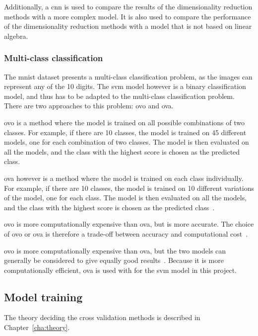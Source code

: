 Additionally, a \gls{cnn} is used to compare the results of the dimensionality reduction methods with a more complex model. It is also used to compare the performance of the dimensionality reduction methods with a model that is not based on linear algebra.


\subsubsection{Multi-class classification}\label{subsubsec:multi-class-classification}
The \gls{mnist} dataset presents a multi-class classification problem, as the images can represent any of the 10 digits. The \gls{svm} model however is a binary classification model, and thus has to be adapted to the multi-class classification problem. There are two approaches to this problem: \gls{ovo} and \gls{ova}.

\gls{ovo} is a method where the model is trained on all possible combinations of two classes. For example, if there are 10 classes, the model is trained on 45 different models, one for each combination of two classes. The model is then evaluated on all the models, and the class with the highest score is chosen as the predicted class.

\gls{ova} however is a method where the model is trained on each class individually. For example, if there are 10 classes, the model is trained on 10 different variations of the model, one for each class. The model is then evaluated on all the models, and the class with the highest score is chosen as the predicted class~\cite{james-statistical-learning}.

\gls{ovo} is more computationally expensive than \gls{ova}, but is more accurate. The choice of \gls{ovo} or \gls{ova} is therefore a trade-off between accuracy and computational cost~\cite{james-statistical-learning}.

\gls{ovo} is more computationally expensive than \gls{ova}, but the two models can generally be considered to give equally good results~\cite{rifkin-defense-one-vs-all}. Because it is more computationally efficient, \gls{ova} is used with for the \gls{svm} model in this project.

\subsection{Model training}\label{subsec:model-training}
The theory deciding the cross validation methods is described in Chapter~\ref{cha:theory}.
